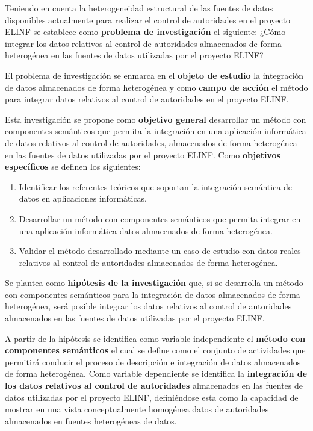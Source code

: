 Teniendo en cuenta la heterogeneidad estructural de las fuentes de datos disponibles actualmente para realizar el control de autoridades en el proyecto ELINF se establece como \textbf{problema de investigación} el siguiente: ¿Cómo integrar los datos relativos al control de autoridades almacenados de forma heterogénea en las fuentes de datos utilizadas por el proyecto ELINF?

El problema de investigación se enmarca en el \textbf{objeto de estudio} la integración de datos almacenados de forma heterogénea y como \textbf{campo de acción} el método para integrar datos relativos al control de autoridades en el proyecto ELINF.

Esta investigación se propone como \textbf{objetivo general} desarrollar un método con componentes semánticos que permita la integración en una aplicación informática de datos relativos al control de autoridades, almacenados de forma heterogénea en las fuentes de datos utilizadas por el proyecto ELINF. Como \textbf{objetivos específicos} se definen los siguientes:

\begin{enumerate}
\item Identificar los referentes teóricos que soportan la integración semántica de datos en aplicaciones informáticas.
\item Desarrollar un método con componentes semánticos que permita integrar en una aplicación informática datos almacenados de forma heterogénea.
\item Validar el método desarrollado mediante un caso de estudio con datos reales relativos al control de autoridades almacenados de forma heterogénea.
\end{enumerate}

Se plantea como \textbf{hipótesis de la investigación} que, si se desarrolla un método con componentes semánticos para la integración de datos almacenados de forma heterogénea, será posible integrar los datos relativos al control de autoridades almacenados en las fuentes de datos utilizadas por el proyecto ELINF.

A partir de la hipótesis se identifica como variable independiente el \textbf{método con componentes semánticos} el cual se define como el conjunto de actividades \citep{Offermann2010} que permitirá conducir el proceso de descripción e integración de datos almacenados de forma heterogénea. Como variable dependiente se identifica la \textbf{integración de los datos relativos al control de autoridades} almacenados en las fuentes de datos utilizadas por el proyecto ELINF, definiéndose esta como la capacidad de mostrar en una vista conceptualmente homogénea datos de autoridades almacenados en fuentes heterogéneas de datos.


